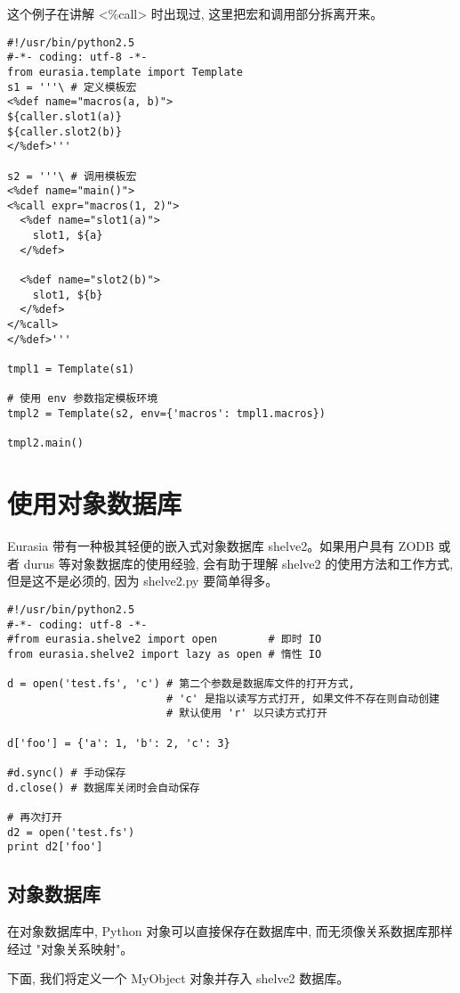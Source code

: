 \documentclass{manual}
\begin{document}
这个例子在讲解 <\%call> 时出现过, 这里把宏和调用部分拆离开来。

\begin{verbatim}
#!/usr/bin/python2.5
#-*- coding: utf-8 -*-
from eurasia.template import Template
s1 = '''\ # 定义模板宏
<%def name="macros(a, b)">
${caller.slot1(a)}
${caller.slot2(b)}
</%def>'''

s2 = '''\ # 调用模板宏
<%def name="main()">
<%call expr="macros(1, 2)">
  <%def name="slot1(a)">
    slot1, ${a}
  </%def>

  <%def name="slot2(b)">
    slot1, ${b}
  </%def>
</%call>
</%def>'''

tmpl1 = Template(s1)

# 使用 env 参数指定模板环境
tmpl2 = Template(s2, env={'macros': tmpl1.macros})

tmpl2.main()
\end{verbatim}

\section{使用对象数据库}

Eurasia 带有一种极其轻便的嵌入式对象数据库 shelve2。如果用户具有 ZODB 或者 durus 等对象数据库的使用经验, 会有助于理解 shelve2 的使用方法和工作方式, 但是这不是必须的, 因为 shelve2.py 要简单得多。

\begin{verbatim}
#!/usr/bin/python2.5
#-*- coding: utf-8 -*-
#from eurasia.shelve2 import open        # 即时 IO
from eurasia.shelve2 import lazy as open # 惰性 IO

d = open('test.fs', 'c') # 第二个参数是数据库文件的打开方式,
                         # 'c' 是指以读写方式打开, 如果文件不存在则自动创建
                         # 默认使用 'r' 以只读方式打开

d['foo'] = {'a': 1, 'b': 2, 'c': 3}

#d.sync() # 手动保存
d.close() # 数据库关闭时会自动保存

# 再次打开
d2 = open('test.fs')
print d2['foo']
\end{verbatim}

\subsection{对象数据库}

在对象数据库中, Python 对象可以直接保存在数据库中, 而无须像关系数据库那样经过 "对象关系映射"。

下面, 我们将定义一个 MyObject 对象并存入 shelve2 数据库。
\end{document}
